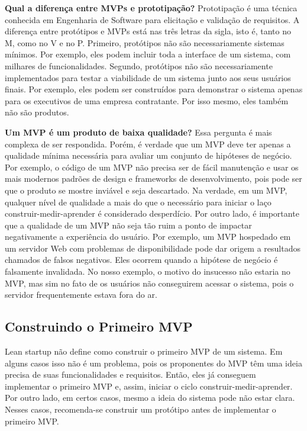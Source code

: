 \documentclass[
  11pt,
  twoside]{book}
\begin{document}
 
\textbf{Qual a diferença entre MVPs e prototipação?} Prototipação é uma
técnica conhecida em Engenharia de Software para elicitação e validação
de requisitos. A diferença entre protótipos e MVPs está nas três letras
da sigla, isto é, tanto no M, como no V e no P. Primeiro, protótipos não
são necessariamente sistemas mínimos. Por exemplo, eles podem incluir
toda a interface de um sistema, com milhares de funcionalidades.
Segundo, protótipos não são necessariamente implementados para testar a
viabilidade de um sistema junto aos seus usuários finais. Por exemplo,
eles podem ser construídos para demonstrar o sistema apenas para os
executivos de uma empresa contratante. Por isso mesmo, eles também não
são produtos.

\textbf{Um MVP é um produto de baixa qualidade?} Essa pergunta é mais
complexa de ser respondida. Porém, é verdade que um MVP deve ter apenas
a qualidade mínima necessária para avaliar um conjunto de hipóteses de
negócio. Por exemplo, o código de um MVP não precisa ser de fácil
manutenção e usar os mais modernos padrões de design e frameworks de
desenvolvimento, pois pode ser que o produto se mostre inviável e seja
descartado. Na verdade, em um MVP, qualquer nível de qualidade a mais do
que o necessário para iniciar o laço construir-medir-aprender é
considerado desperdício. Por outro lado, é importante que a qualidade de
um MVP não seja tão ruim a ponto de impactar negativamente a experiência
do usuário. Por exemplo, um MVP hospedado em um servidor Web com
problemas de disponibilidade pode dar origem a resultados chamados de
falsos negativos. Eles ocorrem quando a hipótese de negócio é falsamente
invalidada. No nosso exemplo, o motivo do insucesso não estaria no MVP,
mas sim no fato de os usuários não conseguirem acessar o sistema, pois o
servidor frequentemente estava fora do ar.

\hypertarget{construindo-o-primeiro-mvp}{%
\subsection{Construindo o Primeiro
MVP}\label{construindo-o-primeiro-mvp}}

Lean startup não define como construir o primeiro MVP de um sistema. Em
alguns casos isso não é um problema, pois os proponentes do MVP têm uma
ideia precisa de suas funcionalidades e requisitos. Então, eles já
conseguem implementar o primeiro MVP e, assim, iniciar o ciclo
construir-medir-aprender. Por outro lado, em certos casos, mesmo a ideia
do sistema pode não estar clara. Nesses casos, recomenda-se construir um
protótipo antes de implementar o primeiro MVP.
\end{document}

